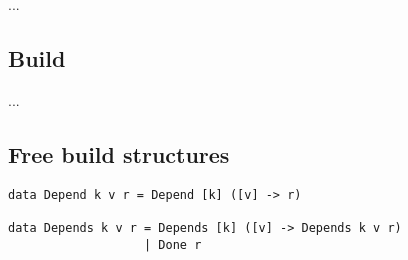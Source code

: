 ...

\subsection{Build}\label{sec-general-build}

...


\subsection{Free build structures}\label{sec-free-build}

\begin{verbatim}
data Depend k v r = Depend [k] ([v] -> r)

data Depends k v r = Depends [k] ([v] -> Depends k v r)
                   | Done r
\end{verbatim}
